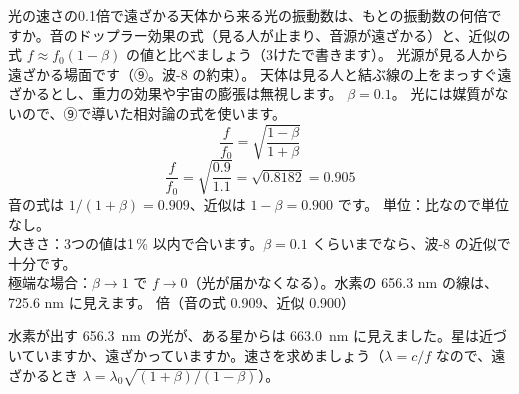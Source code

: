 \label{ph:原-11:ex11}
\begin{phreidai}
光の速さの0.1倍で遠ざかる天体から来る光の振動数は、もとの振動数の何倍ですか。音のドップラー効果の式（見る人が止まり、音源が遠ざかる）と、近似の式 $f\approx f_0(1-\beta)$ の値と比べましょう（3けたで書きます）。
\phbamen
光源が見る人から遠ざかる場面です（⑨。波-8 の約束）。
\phmushi
天体は見る人と結ぶ線の上をまっすぐ遠ざかるとし、重力の効果や宇宙の膨張は無視します。
\phzu
$\beta=0.1$。
\phriyu
光には媒質がないので、⑨で導いた相対論の式を使います。
\phtateru
\[ \frac{f}{f_0}=\sqrt{\frac{1-\beta}{1+\beta}} \]
\phtoku
\[ \frac{f}{f_0}=\sqrt{\frac{0.9}{1.1}}=\sqrt{0.8182}=0.905 \]
音の式は $1/(1+\beta)=0.909$、近似は $1-\beta=0.900$ です。
\phtashikame
単位：比なので単位なし。\\
大きさ：3つの値は1\,\% 以内で合います。$\beta=0.1$ くらいまでなら、波-8 の近似で十分です。\\
極端な場合：$\beta\to1$ で $f\to0$（光が届かなくなる）。水素の 656.3 nm の線は、725.6 nm に見えます。
 倍（音の式 0.909、近似 0.900）
\end{phreidai}
\begin{jibun}
水素が出す \qty{656.3}{nm} の光が、ある星からは \qty{663.0}{nm} に見えました。星は近づいていますか、遠ざかっていますか。速さを求めましょう（$\lambda=c/f$ なので、遠ざかるとき $\lambda=\lambda_0\sqrt{(1+\beta)/(1-\beta)}$）。
\end{jibun}


